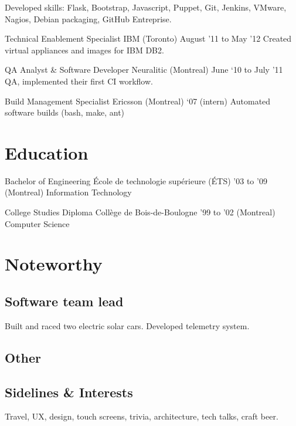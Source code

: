 \documentclass[]{cvpn}
\begin{document}
\begin{eventlist}
{Developed skills: Flask, Bootstrap, Javascript,
Puppet, Git, Jenkins, VMware, Nagios, Debian packaging,
GitHub Entreprise.
}

\item{Technical Enablement Specialist}
     {IBM (Toronto)}
     {August '11 to May '12}
{
Created virtual appliances and images for IBM DB2.
}

\item{QA Analyst \& Software Developer}
     {Neuralitic (Montreal)}
     {June ‘10 to July ’11}
{
QA, implemented their first CI workflow.
}

\item{Build Management Specialist}
     {Ericsson (Montreal)}
     {‘07 (intern)}
{
Automated software builds (bash, make, ant)
}

\end{eventlist}

\section{Education}
\begin{eventlist}

\item{Bachelor of Engineering}
     {École de technologie supérieure (ÉTS)}
     {'03 to '09}
{
(Montreal) Information Technology
}

\item{College Studies Diploma}
     {Collège de Bois-de-Boulogne}
     {'99 to '02}
{
(Montreal) Computer Science
}

\end{eventlist}

\section{Noteworthy}

\subsection{Software team lead}
Built and raced two electric solar cars.
Developed telemetry system.\\

\subsection{Other}

\subsection{Sidelines \& Interests}
Travel, UX, design, touch screens,
trivia, architecture, tech talks, craft beer.
\end{document}
